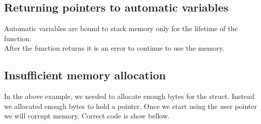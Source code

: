 \subsection{Returning pointers to automatic
variables}\label{returning-pointers-to-automatic-variables}

\begin{Shaded}
\begin{Highlighting}[]
 
     \NormalTok{;}
      
     
     
\NormalTok{\}}
\end{Highlighting}
\end{Shaded}

Automatic variables are bound to stack memory only for the lifetime of
the function.\\After the function returns it is an error to continue to
use the memory.

\subsection{Insufficient memory
allocation}\label{insufficient-memory-allocation}

\begin{Shaded}
\begin{Highlighting}[]
 
    \NormalTok{name[}\NormalTok{];}
\NormalTok{\};}
  

\end{Highlighting}
\end{Shaded}

In the above example, we needed to allocate enough bytes for the struct.
Instead we allocated enough bytes to hold a pointer. Once we start using
the user pointer we will corrupt memory. Correct code is show bellow.

\begin{Shaded}
\begin{Highlighting}[]
 
    \NormalTok{name[}\NormalTok{];}
\NormalTok{\};}
  

\end{Highlighting}
\end{Shaded}

